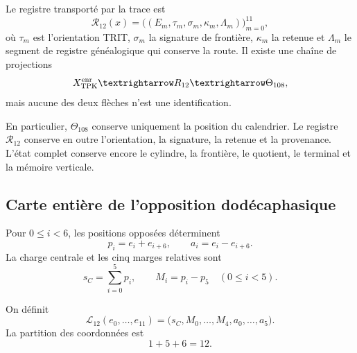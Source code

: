 \begin{definition}
\label{p12-83-c10-s1:def:registro-enriquecido-dodecafasico}
Le registre transporté par la trace est
\[
 \mathcal R_{12}(x)=
 \bigl((E_m,\tau_m,\sigma_m,\kappa_m,\Lambda_m)\bigr)_{m=0}^{11},
\]
où \(\tau_m\) est l’orientation TRIT, \(\sigma_m\) la signature de
frontière, \(\kappa_m\) la retenue et \(\Lambda_m\) le segment de registre généalogique
qui conserve la route. Il existe une chaîne de projections
\[
 \mathcal X_{\rm TPK}^{\rm enr}
 \longrightarrow\mathcal R_{12}
 \longrightarrow\Theta_{108},
\]
mais aucune des deux flèches n’est une identification.
\end{definition}

En particulier, \(\Theta_{108}\) conserve uniquement la position du calendrier.
Le registre \(\mathcal R_{12}\) conserve en outre l’orientation, la signature,
la retenue et la provenance. L’état complet conserve encore le cylindre,
la frontière, le quotient, le terminal et la mémoire verticale.

\subsection{Carte entière de l’opposition dodécaphasique}

Pour \(0\leq i<6\), les positions opposées déterminent
\begin{equation}
 p_i=e_i+e_{i+6},
 \qquad
 a_i=e_i-e_{i+6}.
 \label{p12-83-c10-s1:eq:pares-opuestos-registro}
\end{equation}
La charge centrale et les cinq marges relatives sont
\begin{equation}
 s_C=\sum_{i=0}^{5}p_i,
 \qquad
 M_i=p_i-p_5\quad(0\leq i<5).
 \label{p12-83-c10-s1:eq:carga-margenes-registro}
\end{equation}

\begin{definition}
\label{p12-83-c10-s1:def:carta-integral-156}
On définit
\begin{equation}
 \mathcal L_{12}(e_0,\ldots,e_{11})
 =\bigl(s_C,M_0,\ldots,M_4,a_0,\ldots,a_5\bigr).
 \label{p12-83-c10-s1:eq:carta-integral-156}
\end{equation}
La partition des coordonnées est
\[
 1+5+6=12.
\]
\end{definition}


